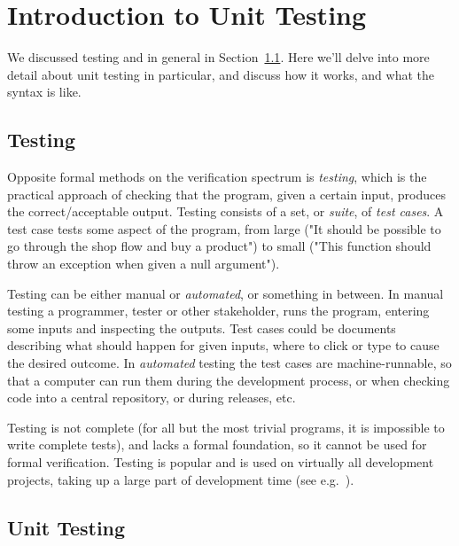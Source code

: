 \documentclass[a4paper,11pt]{kth-mag}
\begin{document}

\pagestyle{newchap}
\chapter{Introduction to Unit Testing} \label{chapter-intro-to-unit-testing}

We discussed testing and in general in Section~\ref{section-testing}. Here
we'll delve into more detail about unit testing in particular, and discuss how
it works, and what the syntax is like.


\section{Testing} \label{section-testing}
Opposite formal methods on the verification spectrum is \emph{testing}, which
is the practical approach of checking that the program, given a certain input,
produces the correct/acceptable output. Testing consists of a set, or
\textit{suite}, of \textit{test cases}. A test case tests some aspect of the
program, from large ("It should be possible to go through the shop flow and buy
a product") to small ("This function should throw an exception when given a
null argument").

Testing can be either manual or \textit{automated}, or something in between. In
manual testing a programmer, tester or other stakeholder, runs the program,
entering some inputs and inspecting the outputs. Test cases could be documents
describing what should happen for given inputs, where to click or type to cause
the desired outcome. In \textit{automated} testing the test cases are
machine-runnable, so that a computer can run them during the development
process, or when checking code into a central repository, or during releases,
etc.

Testing is not complete (for all but the most trivial programs, it is
impossible to write complete tests), and lacks a formal foundation, so it
cannot be used for formal verification. Testing is popular and is used on
virtually all development projects, taking up a large part of development time
(see e.g.\ \cite{brooks75mythicalmanmonth}).


\section{Unit Testing}
\end{document}
